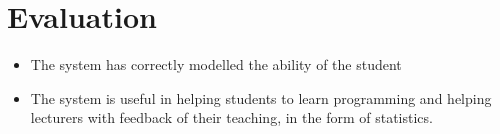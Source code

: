 \documentclass[11pt,a4paper]{report}
\begin{document}

\chapter{Evaluation}
\begin{itemize}
\item The system has correctly modelled the ability of the student
\item The system is useful in helping students to learn programming and helping lecturers with feedback of their teaching, in the form of statistics.
\end{itemize}
\end{document}
